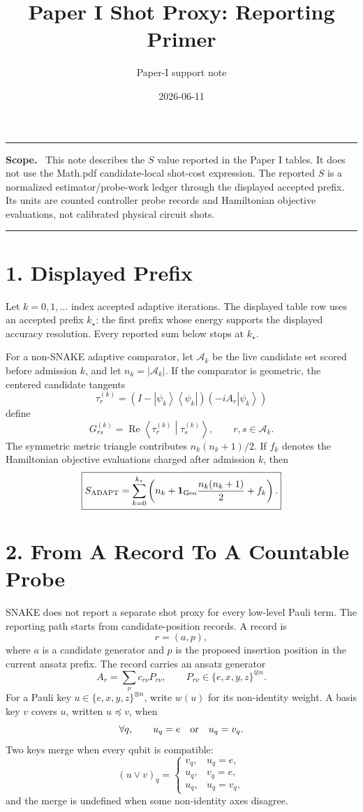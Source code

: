 \documentclass[10pt,twocolumn]{article}
\newcommand{\ket}[1]{\left|#1\right\rangle}
\newcommand{\bra}[1]{\left\langle#1\right|}
\newcommand{\braket}[2]{\left\langle#1\middle|#2\right\rangle}
\newcommand{\Acal}{\mathcal A}
\newcommand{\Sadapt}{S_{\rm ADAPT}}
\newcommand{\oneGeo}{\mathbf 1_{\rm Geo}}
\newcommand{\boxline}{\vspace{2pt}\hrule\vspace{3pt}}
\newenvironment{primerbox}[1]{%
  \boxline\begingroup\raggedright\textbf{#1.}\ }{\par\endgroup\boxline}
\begin{document}
\title{Paper I Shot Proxy: Reporting Primer}
\author{Paper-I support note}
\date{2026-06-11}
\maketitle
\vspace{-1.1em}

\begin{primerbox}{Scope}
This note describes the \(S\) value reported in the Paper I tables.  It does
not use the Math.pdf candidate-local shot-cost expression.  The reported \(S\)
is a normalized estimator/probe-work ledger through the displayed accepted
prefix.  Its units are counted controller probe records and Hamiltonian
objective evaluations, not calibrated physical circuit shots.
\end{primerbox}

\section*{1. Displayed Prefix}

Let \(k=0,1,\ldots\) index accepted adaptive iterations.  The displayed table
row uses an accepted prefix \(k_\star\): the first prefix whose energy supports
the displayed accuracy resolution.  Every reported sum below stops at
\(k_\star\).

For a non-SNAKE adaptive comparator, let \(\Acal_k\) be the live candidate set
scored before admission \(k\), and let \(n_k=|\Acal_k|\).  If the comparator is
geometric, the centered candidate tangents
\[
  \tau_r^{(k)}
  =
  (I-\ket{\psi_k}\bra{\psi_k})(-iA_r\ket{\psi_k})
\]
define
\[
  G_{rs}^{(k)}
  =
  \operatorname{Re}\braket{\tau_r^{(k)}}{\tau_s^{(k)}},
  \qquad r,s\in\Acal_k.
\]
The symmetric metric triangle contributes \(n_k(n_k+1)/2\).  If \(f_k\)
denotes the Hamiltonian objective evaluations charged after admission \(k\),
then
\[
\boxed{
\Sadapt
=
\sum_{k=0}^{k_\star}
\left(
n_k+\oneGeo\frac{n_k(n_k+1)}{2}+f_k
\right).
}
\]

\section*{2. From A Record To A Countable Probe}

SNAKE does not report a separate shot proxy for every low-level Pauli term.
The reporting path starts from candidate-position records.  A record is
\[
  r=(a,p),
\]
where \(a\) is a candidate generator and \(p\) is the proposed insertion
position in the current ansatz prefix.  The record carries an ansatz generator
\[
  A_r=\sum_{\nu} c_{r\nu}P_{r\nu},
  \qquad
  P_{r\nu}\in\{e,x,y,z\}^{\otimes n}.
\]
For a Pauli key \(u\in\{e,x,y,z\}^{\otimes n}\), write \(w(u)\) for its
non-identity weight.  A basis key \(v\) covers \(u\), written \(u\preceq v\),
when
\[
  \forall q,\qquad u_q=e\quad\hbox{or}\quad u_q=v_q .
\]
Two keys merge when every qubit is compatible:
\[
  (u\vee v)_q=
  \begin{cases}
  v_q, & u_q=e,\\
  u_q, & v_q=e,\\
  u_q, & u_q=v_q,
  \end{cases}
\]
and the merge is undefined when some non-identity axes disagree.
\end{document}
